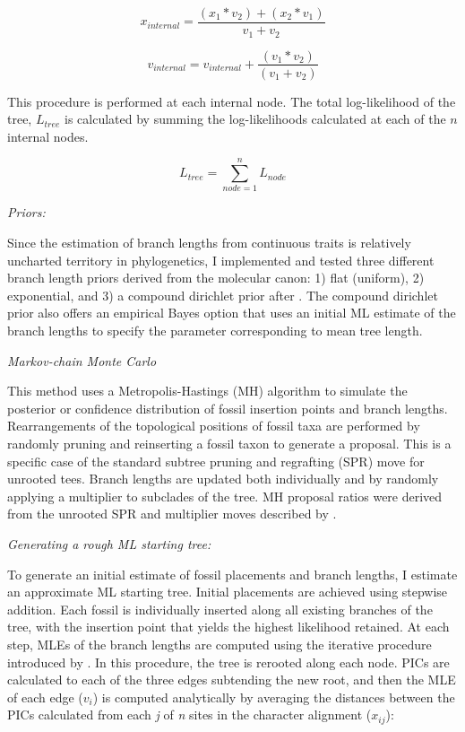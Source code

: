 \documentclass[12pt]{article}
\begin{document}
\begin{equation}
x_{internal} = \frac{(x_1*v_2)+(x_2*v_1)}{v_1+v_2}
\end{equation}

\begin{equation}
v_{internal} = v_{internal} + \frac{(v_1*v_2)}{(v_1+v_2)}
\end{equation}

\noindent This procedure is performed at each internal node. The total log-likelihood of the tree, $L_{tree}$ is calculated by summing the log-likelihoods calculated at each of the $n$ internal nodes.

\begin{equation}
L_{tree} = \sum\limits_{node=1}^{n} L_{node}
\end{equation} 

\noindent\emph{Priors:}

Since the estimation of branch lengths from continuous traits is
relatively uncharted territory in phylogenetics, I implemented and
tested three different branch length priors derived from the molecular
canon: 1) flat (uniform), 2) exponential, and 3) a compound dirichlet
prior after  \citep{rannala2011tail}. The compound dirichlet prior also
offers an empirical Bayes option that uses an initial ML estimate of the
branch lengths to specify the parameter corresponding to mean tree
length.

\noindent\emph{Markov-chain Monte Carlo}

 This method uses a
 Metropolis-Hastings (MH) algorithm \citep{hastings1970monte} to simulate the posterior or confidence distribution of fossil insertion points
and branch lengths. Rearrangements of the topological positions of fossil taxa are performed by randomly pruning
and reinserting a fossil taxon to generate a proposal. This is a
specific case of the standard subtree pruning and regrafting (SPR) move
for unrooted tees. Branch lengths are updated both individually and by randomly applying a
multiplier to subclades of the tree. MH proposal ratios were derived from the unrooted SPR and multiplier moves described by \cite{yang2014molecular}.

\noindent\emph{Generating a rough ML starting tree:}

To generate an initial estimate of fossil placements and branch lengths,
I estimate an approximate ML starting tree. Initial placements are
achieved using stepwise addition. Each fossil is individually inserted
along all existing branches of the tree, with the insertion point that
yields the highest likelihood retained. At each step, MLEs of the branch
lengths are computed using the iterative procedure introduced by
\citep{felsenstein1981evolutionary}. In this procedure, the tree is rerooted along each
node. PICs are calculated to each of the three edges subtending the new
root, and then the MLE of each edge ($v_i$) is computed analytically
by averaging the distances between the PICs calculated from each
\emph{j} of \emph{n} sites in the character alignment ($x_{ij}$):
\end{document}
